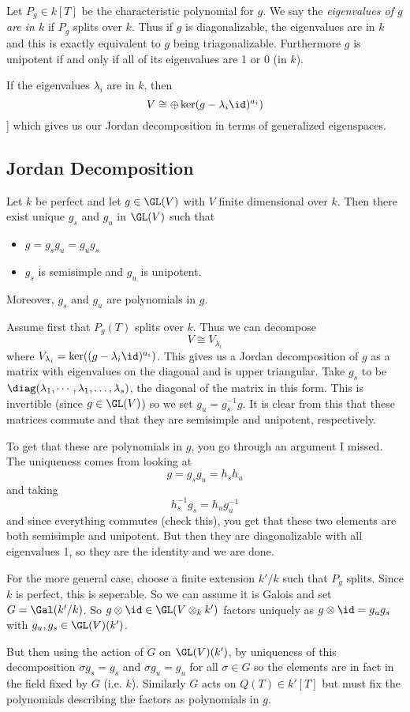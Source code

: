 \documentclass[12pt]{article}
\begin{document}
Let $P_g\in k[T]$ be the characteristic polynomial for $g$. We say the \textit{eigenvalues of $g$ are in $k$} if $P_g$ splits over $k$. Thus if $g$ is diagonalizable, 
the eigenvalues are in $k$ and this is exactly equivalent to $g$ being triagonalizable. Furthermore $g$ is unipotent if and only if 
all of its eigenvalues are 1 or 0 (in $k$).
\begin{prop}
	If the eigenvalues $\lambda_i$ are in $k$, then 
	\[V\cong \oplus\ker(g-\lambda_i\id)^{a_i})\]]
	which gives us our Jordan decomposition in terms of generalized eigenspaces.
\end{prop}

\subsection{Jordan Decomposition}
\begin{thm}
	Let $k$ be perfect and let $g\in\GL(V)$ with $V$ finite dimensional over $k$. Then there exist unique $g_s$ and $g_u$ in $\GL(V)$ such that 
	\begin{itemize}
		\item $g=g_sg_u=g_ug_s$
		\item $g_s$ is semisimple and $g_u$ is unipotent.
	\end{itemize}
	Moreover, $g_s$ and $g_u$ are polynomials in $g$.
\end{thm}
\begin{prf}
	Assume first that $P_g(T)$ splits over $k$. Thus we can decompose 
	\[V\cong V_{\lambda_i}\]
	where $V_{\lambda_i}=\ker((g-\lambda_i\id)^{a_i})$.
	This gives us a Jordan decomposition of $g$ as a matrix with eigenvalues on the diagonal and is upper triangular. Take $g_s$ to be $\diag(\lambda_1,\cdots,\lambda_1,\dots,\lambda_s)$, 
	the diagonal of the matrix in this form. This is invertible (since $g\in\GL(V)$) so we set $g_u=g_s^{-1}g$. It is clear from this that these matrices commute and that they are 
	semisimple and unipotent, respectively.

	To get that these are polynomials in $g$, you go through an argument I missed. The uniqueness comes from looking at 
	\[g=g_sg_u=h_sh_u\]
	and taking 
	\[h_s^{-1}g_s=h_ug_u^{-1}\]
	and since everything commutes (check this), you get that these two elements are both semisimple and unipotent. But then they are diagonalizable with all 
	eigenvalues 1, so they are the identity and we are done.

	For the more general case, choose a finite extension $k'/k$ such that $P_g$ splits. Since $k$ is perfect, this is seperable. So we can assume it is Galois and 
	set $G=\Gal(k'/k)$. So $g\otimes \id\in\GL(V\otimes_k k')$ factors uniquely as $g\otimes \id=g_ug_s$ with $g_u,g_s\in\GL(V)(k')$.

	But then using the action of $G$ on $\GL(V)(k')$, by uniqueness of this decomposition $\sigma g_s=g_s$ and $\sigma g_u=g_u$ for all $\sigma\in G$ so 
	the elements are in fact in the field fixed by $G$ (i.e. $k$). Similarly $G$ acts on $Q(T)\in k'[T]$ but must fix the polynomials describing the factors as polynomials in $g$.
\end{prf}
\end{document}
